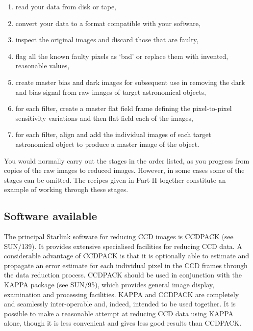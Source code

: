 \documentclass[twoside,11pt]{article}
\newcommand{\xref}[3]{#1}
\begin{document}
\begin{enumerate}

  \item read your data from disk or tape,

  \item convert your data to a format compatible with your software,

  \item inspect the original images and discard those that are faulty,

  \item flag all the known faulty pixels as `bad' or replace them with
   invented, reasonable values,

  \item create master bias and dark images for subsequent use in removing
   the dark and bias signal from raw images of target astronomical objects,

  \item for each filter, create a master flat field frame defining the
   pixel-to-pixel sensitivity variations and then flat field each of the
   images,

  \item for each filter, align and add the individual images of each
   target astronomical object to produce a master image of the object.

\end{enumerate}

You would normally carry out the stages in the order listed, as you progress
from copies of the raw images to reduced images.  However, in some cases
some of the stages can be omitted.  The recipes given in Part II together
constitute an example of working through these stages.

\subsection{\label{SOFTWARE}Software available}

The principal Starlink software for reducing CCD images is CCDPACK (see
\xref{SUN/139}{sun139}{}\/\cite{SUN139}).  It provides extensive
specialised facilities for reducing CCD data.  A considerable advantage
of CCDPACK is that it is optionally able to estimate and propagate an
error estimate for each individual pixel in the CCD frames through the
data reduction process.  CCDPACK should be used in conjunction with the
KAPPA package (see \xref{SUN/95}{sun95}{}\/\cite{SUN95}), which provides
general image display, examination and processing facilities.  KAPPA and
CCDPACK are completely and seamlessly inter-operable and, indeed, intended
to be used together.  It is possible to make a reasonable attempt at
reducing CCD data using KAPPA alone, though it is less convenient and gives
less good results than CCDPACK.
\end{document}
